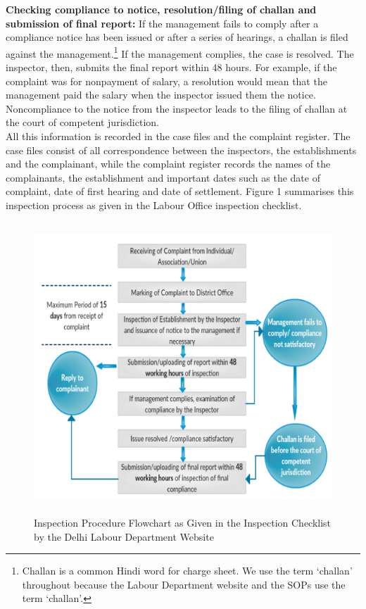 \documentclass[a4paper, 12pt, twoside]{article}
\begin{document}
\textbf{Checking compliance to notice, resolution/filing of challan and submission of final report:} If the management fails to comply after a compliance notice has been issued or after a series of hearings, a challan is filed against the management.\footnote{Challan is a common Hindi word for charge sheet. We use the term ‘challan’ throughout because the Labour Department website and the SOPs use the term ‘challan’.} If the management complies, the case is resolved. The inspector, then, submits the final report within 48 hours. For example, if the complaint was for nonpayment of salary, a resolution would mean that the management paid the salary when the inspector issued them the notice. Noncompliance to the notice from the inspector leads to the filing of challan at the court of competent jurisdiction. \\

All this information is recorded in the case files and the complaint register. The case files consist of all correspondence between the inspectors, the establishments and the complainant, while the complaint register records the names of the complainants, the establishment and important dates such as the date of complaint, date of first hearing and date of settlement. Figure 1 summarises this inspection process as given in the Labour Office inspection checklist.

\begin{figure}[H] %
\centering
\includegraphics[height = 4.3in]{fig1.png}
\captionsetup{justification=centering}\caption[Optional Caption]{Inspection Procedure Flowchart as Given in the Inspection Checklist by the Delhi Labour Department Website}
\end{figure}
\end{document}
